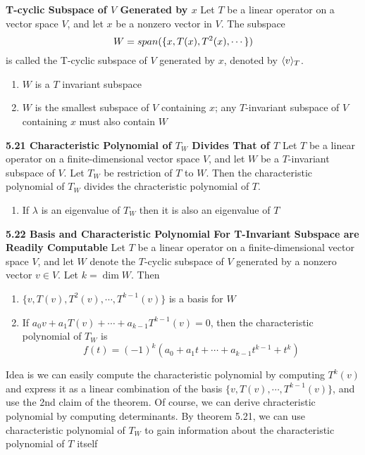 \documentclass[11pt]{article}
\begin{document}
\begin{defn*}
    \textbf{T-cyclic Subspace of $V$ Generated by $x$} Let $T$ be a linear operator on a vector space $V$, and let $x$ be a nonzero vector in $V$. The subspace 
    \[
        W = \span{\{x, T(x), T^2(x), \cdots\}}    
    \]
    is called the T-cyclic subspace of $V$ generated by $x$, denoted by $\tinvariant{T}{v}$. 
    \begin{enumerate}
        \item $W$ is a $T$ invariant subspace 
        \item $W$ is the smallest subspace of $V$ containing $x$; any $T$-invariant subspace of $V$ containing $x$ must also contain $W$
    \end{enumerate}
\end{defn*}

 

\begin{theorem*}
    \textbf{5.21 Characteristic Polynomial of $T_W$ Divides That of $T$} Let $T$ be a linear operator on a finite-dimensional vector space $V$, and let $W$ be a $T$-invariant subspace of $V$. Let $T_W$ be restriction of $T$ to $W$. Then the characteristic polynomial of $T_W$ divides the chracteristic polynomial of $T$.
    \begin{enumerate}
        \item If $\lambda$ is an eigenvalue of $T_W$ then it is also an eigenvalue of $T$
    \end{enumerate}
\end{theorem*}


\begin{theorem*}
    \textbf{5.22 Basis and Characteristic Polynomial For T-Invariant Subspace are Readily Computable}
    Let $T$ be a linear operator on a finite-dimensional vector space $V$, and let $W$ denote the $T$-cyclic subspace of $V$ generated by a nonzero vector $v\in V$. Let $k = \dim{W}$. Then 
    \begin{enumerate}
        \item $\{v, T(v), T^2(v), \cdots, T^{k-1}(v)\}$ is a basis for $W$ 
        \item If $a_0v + a_1T(v) + \cdots + a_{k-1}T^{k-1}(v) = 0$, then the characteristic polynomial of $T_W$ is 
        \[
            f(t) = (-1)^k(a_0 + a_1t + \cdots + a_{k-1}t^{k-1} + t^k)
        \]
    \end{enumerate}
    Idea is we can easily compute the characteristic polynomial by computing $T^k(v)$ and express it as a linear combination of the basis $\{v, T(v), \cdots, T^{k-1}(v)\}$, and use the 2nd claim of the theorem. Of course, we can derive chracteristic polynomial by computing determinants. By theorem 5.21, we can use characteristic polynomial of $T_W$ to gain information about the characteristic polynomial of $T$ itself
\end{theorem*}
\end{document}
